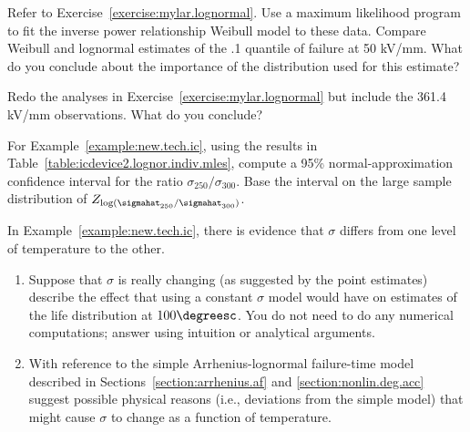 \begin{exercise}
Refer to Exercise~\ref{exercise:mylar.lognormal}.  Use a maximum
likelihood program to fit the inverse power relationship Weibull
model to these data. Compare Weibull and lognormal estimates of the
.1 quantile of failure at 50 kV/mm. What do you conclude about the
importance of the distribution used for this estimate?
\end{exercise}


\begin{exercise}
\label{exercise:mylar.lognormal.all}
Redo the analyses in Exercise~\ref{exercise:mylar.lognormal} but
include the 361.4 kV/mm observations. What do you conclude?
\end{exercise} 


\begin{exercise}
\label{exercise:sigma.ratio}
For Example~\ref{example:new.tech.ic}, using the results in
Table~\ref{table:icdevice2.lognor.indiv.mles}, compute a 95\%
normal-approximation confidence interval for the ratio
$\sigma_{250}/\sigma_{300}$. Base the interval on the large sample
distribution of $Z_{\log(\sigmahat_{250}/\sigmahat_{300})}$.
\end{exercise}


\begin{exercise}
In Example~\ref{example:new.tech.ic}, there is evidence that
$\sigma$ differs from one level of temperature to the other.
\begin{enumerate}
\item
Suppose that $\sigma$ is really changing (as suggested by the point
estimates) describe the effect that using a constant $\sigma$ model would
have on estimates of the life distribution at $100
\degreesc$. You do not need to do any numerical 
computations; answer using intuition or analytical arguments.
\item
With reference to the simple Arrhenius-lognormal failure-time model
described in Sections~\ref{section:arrhenius.af} and
\ref{section:nonlin.deg.acc} suggest possible physical reasons
(i.e., deviations from the simple model) that might cause $\sigma$
to change as a function of temperature.
\end{enumerate}
\end{exercise}


